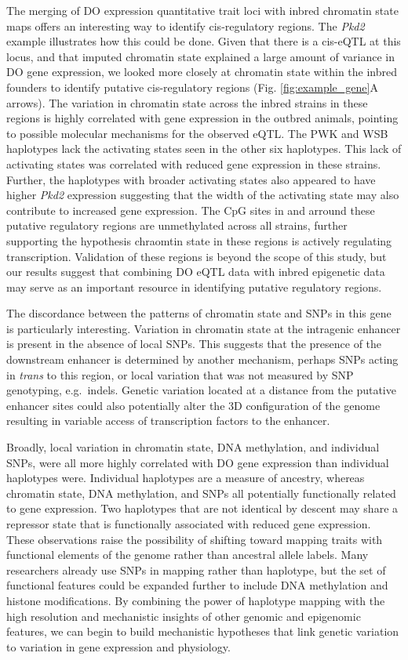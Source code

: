 \documentclass[
  11pt,
]{article}
\begin{document}
The merging of DO expression quantitative trait loci with inbred
chromatin state maps offers an interesting way to identify
cis-regulatory regions. The \textit{Pkd2} example illustrates how this
could be done. Given that there is a cis-eQTL at this locus, and that
imputed chromatin state explained a large amount of variance in DO gene
expression, we looked more closely at chromatin state within the inbred
founders to identify putative cis-regulatory regions (Fig.
\ref{fig:example_gene}A arrows). The variation in chromatin state across
the inbred strains in these regions is highly correlated with gene
expression in the outbred animals, pointing to possible molecular
mechanisms for the observed eQTL. The PWK and WSB haplotypes lack the
activating states seen in the other six haplotypes. This lack of
activating states was correlated with reduced gene expression in these
strains. Further, the haplotypes with broader activating states also
appeared to have higher \textit{Pkd2} expression suggesting that the
width of the activating state may also contribute to increased gene
expression. The CpG sites in and arround these putative regulatory
regions are unmethylated across all strains, further supporting the
hypothesis chraomtin state in these regions is actively regulating
transcription. Validation of these regions is beyond the scope of this
study, but our results suggest that combining DO eQTL data with inbred
epigenetic data may serve as an important resource in identifying
putative regulatory regions.

The discordance between the patterns of chromatin state and SNPs in this
gene is particularly interesting. Variation in chromatin state at the
intragenic enhancer is present in the absence of local SNPs. This
suggests that the presence of the downstream enhancer is determined by
another mechanism, perhaps SNPs acting in \emph{trans} to this region,
or local variation that was not measured by SNP genotyping, e.g.~indels.
Genetic variation located at a distance from the putative enhancer sites
could also potentially alter the 3D configuration of the genome
resulting in variable access of transcription factors to the enhancer.

Broadly, local variation in chromatin state, DNA methylation, and
individual SNPs, were all more highly correlated with DO gene expression
than individual haplotypes were. Individual haplotypes are a measure of
ancestry, whereas chromatin state, DNA methylation, and SNPs all
potentially functionally related to gene expression. Two haplotypes that
are not identical by descent may share a repressor state that is
functionally associated with reduced gene expression. These observations
raise the possibility of shifting toward mapping traits with functional
elements of the genome rather than ancestral allele labels. Many
researchers already use SNPs in mapping rather than haplotype, but the
set of functional features could be expanded further to include DNA
methylation and histone modifications. By combining the power of
haplotype mapping with the high resolution and mechanistic insights of
other genomic and epigenomic features, we can begin to build mechanistic
hypotheses that link genetic variation to variation in gene expression
and physiology.
\end{document}
